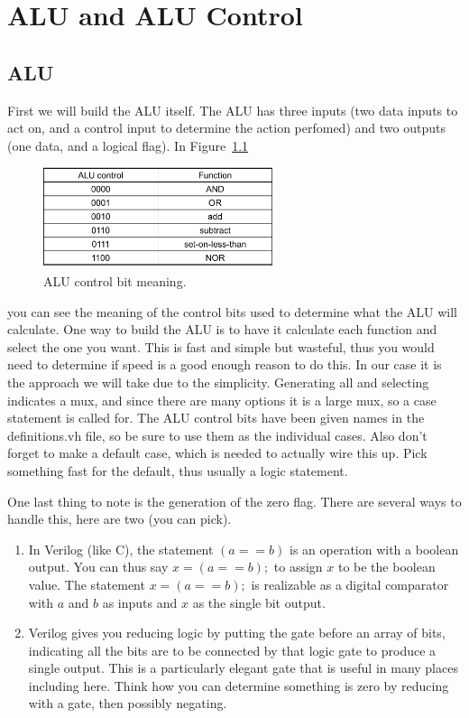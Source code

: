 \chapter{ALU and ALU Control}

\section{ALU}

First we will build the ALU itself.  The ALU has three inputs (two data inputs to act on, and a control input to determine the action perfomed) and two outputs (one data, and a logical flag). In Figure~\ref{fig:alubits}
\begin{figure}
\caption{ALU control bit meaning.}\label{fig:alubits}
\begin{center}
\includegraphics[width=0.6\textwidth]{../images/alubits.png}
\end{center}
\end{figure}
you can see the meaning of the control bits used to determine what the ALU will calculate.  One way to build the ALU is to have it calculate each function and select the one you want.  This is fast and simple but wasteful, thus you would need to determine if speed is a good enough reason to do this.  In our case it is the approach we will take due to the simplicity.  Generating all and selecting indicates a mux, and since there are many options it is a large mux, so a case statement is called for.  The ALU control bits have been given names in the definitions.vh file, so be sure to use them as the individual cases.  Also don't forget to make a default case, which is needed to actually wire this up.  Pick something fast for the default, thus usually a logic statement.

One last thing to note is the generation of the zero flag.  There are several ways to handle this, here are two (you can pick).  
\begin{enumerate}
\item In Verilog (like C), the statement $(a==b)$ is an operation with a boolean output.  You can thus say $x=(a==b);$ to assign $x$ to be the boolean value.  The statement $x=(a==b);$ is realizable as a digital comparator with $a$ and $b$ as inputs and $x$ as the single bit output.
\item Verilog gives you reducing logic by putting the gate before an array of bits, indicating all the bits are to be connected by that logic gate to produce a single output.  This is a particularly elegant gate that is useful in many places including here.  Think how you can determine something is zero by reducing with a gate, then possibly negating.
\end{enumerate}

